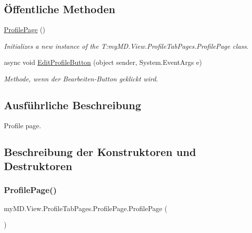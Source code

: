 \subsection*{Öffentliche Methoden}
\begin{DoxyCompactItemize}
\item 
\mbox{\hyperlink{classmy_m_d_1_1_view_1_1_profile_tab_pages_1_1_profile_page_a5be5466e59fdf1afd7f16aee673b2915}{Profile\+Page}} ()
\begin{DoxyCompactList}\small\item\em Initializes a new instance of the T\+:my\+M\+D.\+View.\+Profile\+Tab\+Pages.\+Profile\+Page class. \end{DoxyCompactList}\item 
async void \mbox{\hyperlink{classmy_m_d_1_1_view_1_1_profile_tab_pages_1_1_profile_page_abab1096a4fd1feed046a0a83cd66ff84}{Edit\+Profile\+Button}} (object sender, System.\+Event\+Args e)
\begin{DoxyCompactList}\small\item\em Methode, wenn der Bearbeiten-\/\+Button geklickt wird. \end{DoxyCompactList}\end{DoxyCompactItemize}


\subsection{Ausführliche Beschreibung}
Profile page. 



\subsection{Beschreibung der Konstruktoren und Destruktoren}
\mbox{\label{classmy_m_d_1_1_view_1_1_profile_tab_pages_1_1_profile_page_a5be5466e59fdf1afd7f16aee673b2915}} 
\subsubsection{\texorpdfstring{Profile\+Page()}{ProfilePage()}}
{\footnotesize\ttfamily my\+M\+D.\+View.\+Profile\+Tab\+Pages.\+Profile\+Page.\+Profile\+Page (\begin{DoxyParamCaption}{ }\end{DoxyParamCaption})}



